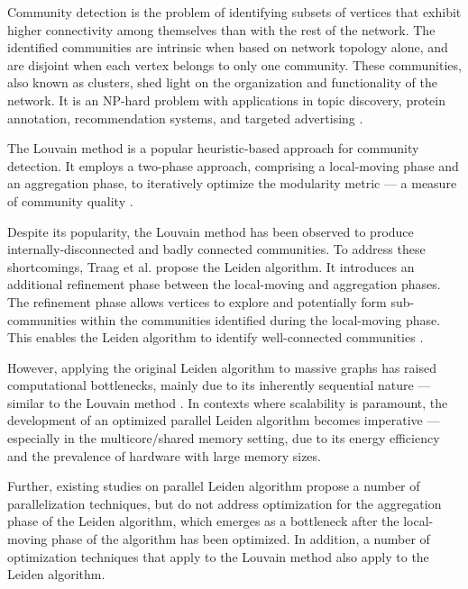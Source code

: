 Community detection is the problem of identifying subsets of vertices that exhibit higher connectivity among themselves than with the rest of the network. The identified communities are intrinsic when based on network topology alone, and are disjoint when each vertex belongs to only one community. These communities, also known as clusters, shed light on the organization and functionality of the network. It is an NP-hard problem with applications in topic discovery, protein annotation, recommendation systems, and targeted advertising \cite{com-gregory10}. The Louvain method \cite{com-blondel08} is a popular heuristic-based approach for community detection. It employs a two-phase approach, comprising a local-moving phase and an aggregation phase, to iteratively optimize the modularity metric --- a measure of community quality \cite{com-newman06}.

Despite its popularity, the Louvain method has been observed to produce internally-disconnected and badly connected communities. To address these shortcomings, Traag et al. \cite{com-traag19} propose the Leiden algorithm. It introduces an additional refinement phase between the local-moving and aggregation phases. The refinement phase allows vertices to explore and potentially form sub-communities within the communities identified during the local-moving phase. This enables the Leiden algorithm to identify well-connected communities \cite{com-traag19}.

However, applying the original Leiden algorithm to massive graphs has raised computational bottlenecks, mainly due to its inherently sequential nature --- similar to the Louvain method \cite{com-halappanavar17}. In contexts where scalability is paramount, the development of an optimized parallel Leiden algorithm becomes imperative --- especially in the multicore/shared memory setting, due to its energy efficiency and the prevalence of hardware with large memory sizes. Further, existing studies on parallel Leiden algorithm \cite{verweijfaster, nguyenleiden} propose a number of parallelization techniques, but do not address optimization for the aggregation phase of the Leiden algorithm, which emerges as a bottleneck after the local-moving phase of the algorithm has been optimized. In addition, a number of optimization techniques that apply to the Louvain method also apply to the Leiden algorithm.

